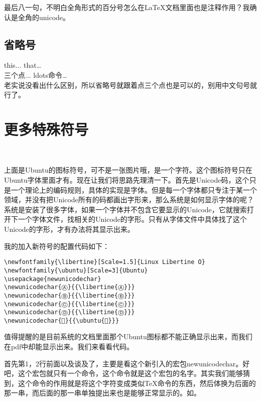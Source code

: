 最后八一句，不明白全角形式的百分号怎么在\LaTeX 文档里面也是注释作用？我确认是全角的unicode。

\subsection{省略号}
this...   that\ldots   \\
三个点...   ldots命令\ldots  \\
老实说没看出什么区别，所以省略号就跟着点三个点也是可以的，别用中文句号就行了。



\section{更多特殊符号}
{\fontsize{50pt}{10pt}\selectfont \color[HTML]{DE4815}  }

上面是Ubuntu的图标符号，可不是一张图片哦，是一个字符。这个图标符号只在Ubuntu字体里面才有。现在让我们将思路先理清一下。首先是Unicode码，这个只是一个理论上的编码规则，具体的实现是字体。但是每一个字体都只专注于某一个领域，并没有把Unicode所有的码都画出字形来，那么系统是如何显示字体的呢？系统是安装了很多字体，如果一个字体并不包含它要显示的Unicode，它就搜索打开下一个字体文件，找相关的Unicode的字形。只有从字体文件中具体找了这个Unicode的字形，才有办法将其显示出来。

我的加入新符号的配置代码如下：
\begin{verbatim}
\newfontfamily{\libertine}[Scale=1.5]{Linux Libertine O}
\newfontfamily{\ubuntu}[Scale=3]{Ubuntu}
\usepackage{newunicodechar}
\newunicodechar{Ⓐ}{{\libertine{Ⓐ}}}
\newunicodechar{Ⓑ}{{\libertine{Ⓑ}}}
\newunicodechar{Ⓒ}{{\libertine{Ⓒ}}} 
\newunicodechar{Ⓓ}{{\libertine{Ⓓ}}}
\newunicodechar{}{{\ubuntu{}}}
\end{verbatim}

值得提醒的是目前系统的文档里面那个Ubuntu图标都不能正确显示出来，而我们在pdf中却能显示出来。我们来看看代码。

首先第1，2行前面以及谈及了，主要是看这个新引入的宏包newunicodechar。好吧，这个宏包就只有一个命令，这个命令就是这个宏包的名字。其实我们能够猜到，这个命令的作用就是将这个字符变成类似\TeX 命令的东西，然后体换为后面的那一串，而后面的那一串单独提出来也是能够正常显示的。如{}。

